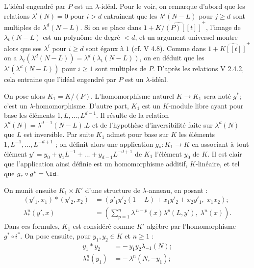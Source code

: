 
L'idéal engendré par \(P\) est un \(\lambda\)-idéal. Pour le voir, on remarque d'abord que les relations \(\lambda^i(N)=0\) pour \(i>d\) entrainent que les \(\lambda^j(N-L)\) pour \(j\ge d\) sont multiples de \(\lambda^d(N-L)\). Si on se place dans \(1+\widehat{K/(P)[[t]]}^+\), l'image de \(\lambda_t(N-L)\) est un polynôme de degré \(<d\), et un argument universel montre alors que ses \(\lambda^i\) pour \(i\ge d\) sont égaux à \(1\) (cf. V 4.8). Comme dans \(1+\widehat{K[[t]]}^+\) on a \(\lambda_t(\lambda^d(N-L))=\lambda^d(\lambda_t(N-L))\), on en déduit que les \(\lambda^i(\lambda^d(N-L))\) pour \(i\ge1\) sont multiples de \(P\). D'après les relations V 2.4.2, cela entraine que l'idéal engendré par \(P\) est un \(\lambda\)-idéal.

On pose alors \(K_1=K/(P)\). L'homomorphisme naturel \(K\to K_1\) sera noté \(g^*\); c'est un \(\lambda\)-homomorphisme. D'autre part, \(K_1\) est un \(K\)-module libre ayant pour base les éléments \(1,L,\ldots,L^{d-1}\). Il résulte de la relation \(\lambda^d(N)=\lambda^{d-1}(N-L).L\) et de l'hypothèse d'inversibilité faite sur \(\lambda^d(N)\) que \(L\) est inversible. Par suite \(K_1\) admet pour base sur \(K\) les éléments \(1,L^{-1},\ldots,L^{-d+1}\) ; on définit alors une application \(g_*:K_1\to K\) en associant à tout élément \(y'=y_0+y_1L^{-1}+\ldots+y_{d-1}L^{-d+1}\) de \(K_1\) l'élément \(y_0\) de \(K\). Il est clair que l'application ainsi définie est un homomorphisme additif, \(K\)-linéaire, et tel que \(g_*\circ g^*=\Id\).

On munit ensuite \(K_1\times K'\) d'une structure de \(\lambda\)-anneau, en posant :
\begin{align}
 (y'_1,x_1)*(y'_2,x_2)
   &=(y'_1y'_2(1-L)+x_1y'_2+x_2y'_1,\; x_1x_2); \tag{4.7.1}\\
 \lambda^n_*(y',x)
   &=\left(\sum_{p=1}^{n}\lambda^{\,n-p}(x)\lambda^p(L,y'),\;
     \lambda^n(x)\right). \tag{4.7.2}
\end{align}
Dans ces formules, \(K_1\) est considéré comme \(K'\)-algèbre par l'homomorphisme \(g^*\circ i^*\).
On pose ensuite, pour \(y_1,y_2\in K\) et \(n\ge1\) :
\begin{align}
 y_1*y_2&=-\,y_1y_2\lambda_{-1}(N); \tag{4.7.3}\\
 \lambda^n_*(y_1)&=-\,\lambda^n(N,-y_1); \tag{4.7.4}
\end{align}
